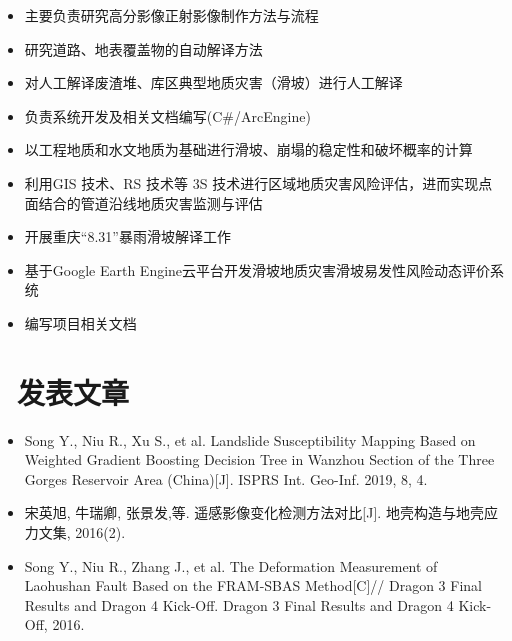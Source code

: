 \documentclass{resume}
\begin{document}
\begin{itemize}
  \item 主要负责研究高分影像正射影像制作方法与流程
  \item 研究道路、地表覆盖物的自动解译方法
  \item 对人工解译废渣堆、库区典型地质灾害（滑坡）进行人工解译
\end{itemize}

\begin{itemize}
  \item 负责系统开发及相关文档编写(C\#/ArcEngine)
  \item 以工程地质和水文地质为基础进行滑坡、崩塌的稳定性和破坏概率的计算
  \item 利用GIS 技术、RS 技术等 3S 技术进行区域地质灾害风险评估，进而实现点面结合的管道沿线地质灾害监测与评估
\end{itemize}

\begin{itemize}
  \item 开展重庆“8.31”暴雨滑坡解译工作
  \item 基于Google Earth Engine云平台开发滑坡地质灾害滑坡易发性风险动态评价系统
  \item 编写项目相关文档
\end{itemize}


\section{\faUsers\ 发表文章}
\begin{itemize}

\item  Song Y., Niu R., Xu S., et al. Landslide Susceptibility Mapping Based on Weighted Gradient Boosting Decision Tree in Wanzhou Section of the Three Gorges Reservoir Area (China)[J]. ISPRS Int. Geo-Inf. 2019, 8, 4. 
\item 宋英旭, 牛瑞卿, 张景发,等. 遥感影像变化检测方法对比[J]. 地壳构造与地壳应力文集, 2016(2). 
\item Song Y., Niu R., Zhang J., et al. The Deformation Measurement of Laohushan Fault Based on the FRAM-SBAS Method[C]// Dragon 3 Final Results and Dragon 4 Kick-Off. Dragon 3 Final Results and Dragon 4 Kick-Off, 2016. 
\end{itemize}
\end{document}
